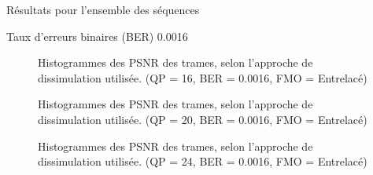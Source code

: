 \begin{section}{Résultats pour l'ensemble des séquences}
\begin{subsection}{Taux d'erreurs binaires (BER) 0.0016}
\begin{figure} 
\caption[]{Histogrammes des PSNR des trames, selon l'approche de dissimulation
utilisée. (QP = 16, BER = 0.0016, FMO = Entrelacé)}
\label{fig-HistAllDInterlaced16x16}
\end{figure}

\begin{figure} 
\caption[]{Histogrammes des PSNR des trames, selon l'approche de dissimulation
utilisée. (QP = 20, BER = 0.0016, FMO = Entrelacé)}
\label{fig-HistAllDInterlaced20x16}
\end{figure}

\begin{figure} 
\caption[]{Histogrammes des PSNR des trames, selon l'approche de dissimulation
utilisée. (QP = 24, BER = 0.0016, FMO = Entrelacé)}
\label{fig-HistAllDInterlaced24x16}
\end{figure}


\end{subsection}
\end{section}
